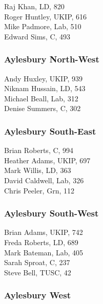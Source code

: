 \documentclass[a4paper,openany,10pt]{book}
\begin{document}


Raj Khan, LD, 820\\
Roger Huntley, UKIP, 616\\
Mike Padmore, Lab, 510\\
Edward Sims, C, 493\\


\subsubsection*{Aylesbury North-West}



Andy Huxley, UKIP, 939\\
Niknam Hussain, LD, 543\\
Michael Beall, Lab, 312\\
Denise Summers, C, 302\\


\subsubsection*{Aylesbury South-East}



Brian Roberts, C, 994\\
Heather Adams, UKIP, 697\\
Mark Willis, LD, 363\\
David Caldwell, Lab, 326\\
Chris Peeler, Grn, 112\\


\subsubsection*{Aylesbury South-West}



Brian Adams, UKIP, 742\\
Freda Roberts, LD, 689\\
Mark Bateman, Lab, 405\\
Sarah Sproat, C, 237\\
Steve Bell, TUSC, 42\\


\subsubsection*{Aylesbury West}
\end{document}
